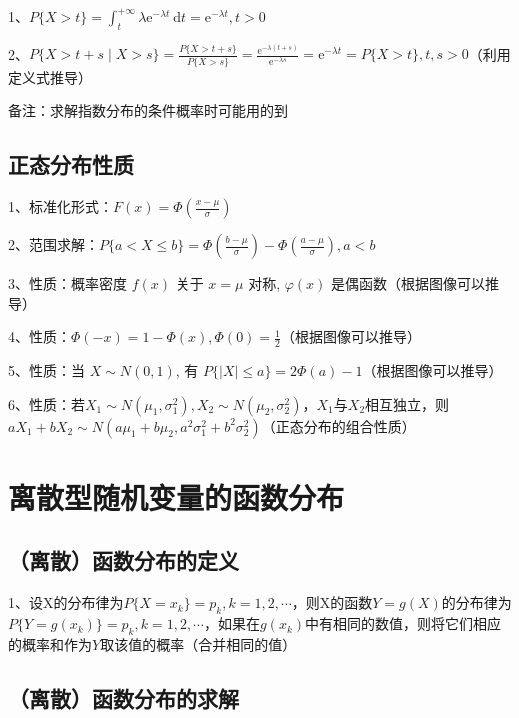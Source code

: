 1、$P\{X>t\}=\int_{t}^{+\infty} \lambda \mathrm{e}^{-\lambda t} \mathrm{~d} t=\mathrm{e}^{-\lambda t}, t>0$

2、$P\{X>t+s \mid X>s\}=\frac{P\{X>t+s\}}{P\{X>s\}}=\frac{\mathrm{e}^{-\lambda(t+s)}}{\mathrm{e}^{-\lambda s}}=\mathrm{e}^{-\lambda t}=P\{X>t\}, t, s>0$（利用定义式推导）

备注：求解指数分布的条件概率时可能用的到



\subsection{正态分布性质}

1、标准化形式：$F(x)=\Phi\left(\frac{x-\mu}{\sigma}\right)$

2、范围求解：$P\{a<X \leqslant b\}=\Phi\left(\frac{b-\mu}{\sigma}\right)-\Phi\left(\frac{a-\mu}{\sigma}\right), a<b$

3、性质：概率密度 $f(x)$ 关于 $x=\mu$ 对称, $\varphi(x)$ 是偶函数（根据图像可以推导）

4、性质：$\Phi(-x)=1-\Phi(x), \Phi(0)=\frac{1}{2}$（根据图像可以推导）

5、性质：当 $X \sim N(0,1)$, 有 $P\{|X| \leqslant a\}=2 \Phi(a)-1$（根据图像可以推导）

6、性质：若$X_{1} \sim N\left(\mu_{1}, \sigma_{1}^{2}\right), X_{2} \sim N\left(\mu_{2}, \sigma_{2}^{2}\right)$，$X_{1}$与$X_{2}$相互独立，则$a X_{1}+b X_{2} \sim N\left(a \mu_{1}+b \mu_{2}, a^{2} \sigma_{1}^{2}+b^{2} \sigma_{2}^{2}\right)$（正态分布的组合性质）

\section{离散型随机变量的函数分布}



\subsection{（离散）函数分布的定义}

1、设X的分布律为$P\{X=x_k\}=p_k,k=1,2,\cdots$，则X的函数$Y=g(X)$的分布律为$P\{Y=g(x_k)\}=p_k,k=1,2,\cdots$，如果在$g(x_k)$中有相同的数值，则将它们相应的概率和作为$Y$取该值的概率（合并相同的值）



\subsection{（离散）函数分布的求解}

